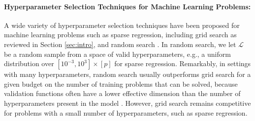 \documentclass[mnsc,nonblindrev]{informs3} %
\newcommand{\ag}[1]{{\color{black}#1}}
\begin{document}
\paragraph{Hyperparameter Selection Techniques for Machine Learning Problems:} 
A wide variety of hyperparameter selection techniques have been proposed for machine learning problems such as sparse regression, 
{\color{black}including grid search \citep[][]{larochelle2007empirical} as reviewed in Section \ref{sec:intro},}
{\color{black}and random search \citep[cf.][]{bergstra2012random}.} %
In random search, we let $\mathcal{L}$ be a random sample from a space of valid hyperparameters, e.g., a uniform distribution over $[10^{-3}, 10^3] \times [p]$ for sparse regression. Remarkably, in settings with many hyperparameters, random search usually outperforms grid search for a given budget on the number of training problems that can be solved, because validation functions often have a lower effective dimension than the number of hyperparameters present in the model \citep[][]{bergstra2012random}. %
However, grid search remains competitive for problems with a small number of hyperparameters, such as sparse regression. %
\end{document}

